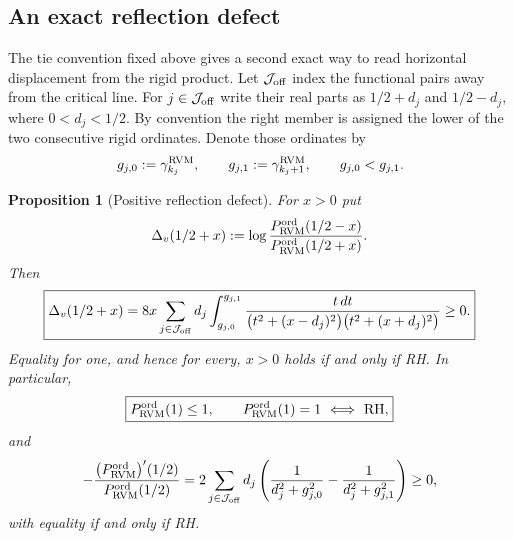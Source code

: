 \documentclass[11pt,reqno]{amsart}
\numberwithin{equation}{section}
\theoremstyle{plain}
\newtheorem{proposition}[theorem]{Proposition}
\theoremstyle{definition}
\theoremstyle{remark}
\begin{document}
\subsection{An exact reflection defect}

The tie convention fixed above gives a second exact way to read horizontal
displacement from the rigid product.  Let $\mathcal J_{\rm off}$ index the
functional pairs away from the critical line.  For $j\in\mathcal J_{\rm off}$
write their real parts as $1/2+d_j$ and $1/2-d_j$, where
$0<d_j<1/2$.  By convention the right member is assigned the lower of the
two consecutive rigid ordinates.  Denote those ordinates by
\begin{equation}
\label{eq:RVM-oriented-pair-ordinates}
 g_{j,0}:=\gamma_{k_j}^{\rm RVM},
 \qquad
 g_{j,1}:=\gamma_{k_j+1}^{\rm RVM},
 \qquad g_{j,0}<g_{j,1}.
\end{equation}

\begin{proposition}[Positive reflection defect]
\label{prop:RVM-positive-reflection-defect}
For $x>0$ put
\begin{equation}
\label{eq:RVM-reflection-defect-definition}
 \Delta_v(1/2+x)
 :=\log\frac{P_{\rm RVM}^{\rm ord}(1/2-x)}{P_{\rm RVM}^{\rm ord}(1/2+x)}.
\end{equation}
Then
\begin{equation}
\label{eq:RVM-positive-reflection-defect}
 \boxed{
 \Delta_v(1/2+x)
 =8x\sum_{j\in\mathcal J_{\rm off}}d_j
 \int_{g_{j,0}}^{g_{j,1}}
 \frac{t\,dt}
 {\bigl(t^2+(x-d_j)^2\bigr)
  \bigl(t^2+(x+d_j)^2\bigr)}
 \ge0.}
\end{equation}
Equality for one, and hence for every, $x>0$ holds if and only if RH.
In particular,
\begin{equation}
\label{eq:RVM-Pv-one-criterion}
 \boxed{P_{\rm RVM}^{\rm ord}(1)\le1,
 \qquad P_{\rm RVM}^{\rm ord}(1)=1\ \Longleftrightarrow\ \mathrm{RH},}
\end{equation}
and
\begin{equation}
\label{eq:RVM-central-log-derivative}
 -\frac{\bigl(P_{\rm RVM}^{\rm ord}\bigr)'(1/2)}{P_{\rm RVM}^{\rm ord}(1/2)}
 =2\sum_{j\in\mathcal J_{\rm off}}d_j
 \left(
 \frac1{d_j^2+g_{j,0}^2}
 -\frac1{d_j^2+g_{j,1}^2}
 \right)\ge0,
\end{equation}
with equality if and only if RH.
\end{proposition}
\end{document}
